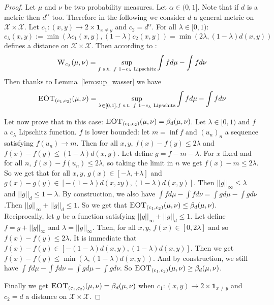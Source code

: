 \begin{proof} 
Let $\mu$ and $\nu$ be two probability measures. Let $\alpha\in (0,1]$. Note that if $d$ is a metric then $d^\alpha$ too. Therefore in the following we consider $d$ a general metric on $\mathcal{X}\times\mathcal{X}$. Let $c_1:(x,y)\rightarrow2\times \mathbf{1}_{x\neq y}$ and $c_2=d^{\alpha}$. For all $\lambda\in[0,1)$:
$$c_\lambda(x,y) := \min(\lambda c_1(x,y),(1-\lambda)c_2(x,y))=\min(2\lambda,(1-\lambda)d(x,y))$$
defines a distance on  $\mathcal{X}\times\mathcal{X}$. Then according to \cite[Theorem 1.14]{villani2003topics}: 
$$\textsc{W}_{c_\lambda}(\mu,\nu)=\sup_{f\text{ s.t. } f\text{ }1-c_\lambda\text{ Lipschitz}}\int fd\mu-\int fd\nu$$
Then thanks to Lemma~\ref{lem:sup_wasser} we have
$$\textsc{EOT}_{(c_1,c_2)}(\mu,\nu) = \sup_{\lambda\in[0,1],f\text{ s.t. } f\text{ }1-c_\lambda\text{ Lipschitz}}\int fd\mu-\int fd\nu$$

Let now prove that in this case: $\textsc{EOT}_{(c_1,c_2)}(\mu,\nu) = \beta_d(\mu,\nu)$. Let $\lambda \in [0,1)$ and $f$ a $c_\lambda$ Lipschitz function. $f$ is lower bounded: let $m = \inf f$ and $(u_n)_n$ a sequence satisfying $f(u_n)\rightarrow m$. Then for all $x,y$, $f(x)-f(y)\leq2\lambda$ and  $f(x)-f(y)\leq(1-\lambda)d(x,y)$. Let define $g=f-m-\lambda$. For $x$ fixed and for all $n$,  $f(x)-f(u_n)\leq2\lambda$, so taking the limit in $n$ we get $f(x)-m\leq2\lambda$.  So we get that for all $x,y$, $g(x)\in[-\lambda,+\lambda]$ and $g(x)-g(y)\in[-(1-\lambda)d(x,zy),(1-\lambda)d(x,y)]$. Then $||g||_\infty\leq \lambda$ and $||g||_d\leq 1-\lambda$. By construction, we also have $\int fd\mu-\int fd\nu=\int gd\mu-\int gd\nu$.Then $||g||_\infty+||g||_d\leq 1$. So we get that $\textsc{EOT}_{(c_1,c_2)}(\mu,\nu) \leq \beta_d(\mu,\nu)$.\\
Reciprocally, let $g$ be a function satisfying $||g||_\infty+||g||_d\leq 1$. Let define $f=g+||g||_\infty$ and $\lambda = ||g||_\infty$. Then, for all $x,y$, $f(x)\in[0,2\lambda]$ and so $f(x)-f(y)\leq 2\lambda$. It is immediate that $f(x)-f(y)\in[-(1-\lambda)d(x,y),(1-\lambda)d(x,y)]$. Then we get $f(x)-f(y)\leq \min(\lambda,(1-\lambda)d(x,y))$. And by construction, we still have $\int fd\mu-\int fd\nu=\int gd\mu-\int gd\nu$. So $\textsc{EOT}_{(c_1,c_2)}(\mu,\nu) \geq \beta_d(\mu,\nu)$.

\medskip

Finally we get $\textsc{EOT}_{(c_1,c_2)}(\mu,\nu) = \beta_d(\mu,\nu)$ when $c_1:(x,y)\rightarrow2\times \mathbf{1}_{x\neq y}$ and $c_2=d$ a distance on $\mathcal{X}\times\mathcal{X}$.
\end{proof}



